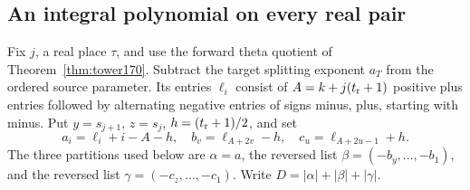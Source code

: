 \documentclass[a4paper,11pt]{article}
\theoremstyle{definition}
\theoremstyle{remark}
\numberwithin{equation}{section}
\begin{document}
\subsection{An integral polynomial on every real pair}\label{nav:VIII-26}
Fix \(j\), a real place \(\tau\), and use the forward
theta quotient of Theorem~\ref{thm:tower170}. Subtract the
target splitting exponent \(a_T\) from the ordered source
parameter. Its entries \(\ell_i\) consist of \(A=k+j(t_{\rm r}+1)\)
positive plus entries followed by alternating negative entries
of signs minus, plus, starting with minus. Put \(y=s_{j+1}\),
\(z=s_j\), \(h=(t_{\rm r}+1)/2\), and set
\[
 a_i=\ell_i+i-A-h,\quad b_v=\ell_{A+2v}-h,\quad
 c_u=\ell_{A+2u-1}+h .
\]
The three partitions used below are \(\alpha=a\), the reversed
list \(\beta=(-b_y,\ldots,-b_1)\), and the reversed list
\(\gamma=(-c_z,\ldots,-c_1)\). Write \(D=|\alpha|+|\beta|+|\gamma|\).
\end{document}
